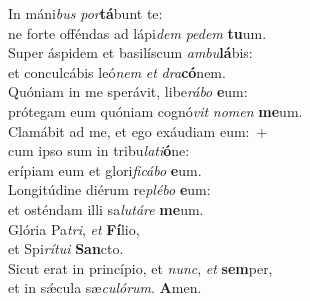 \evenverse In máni\textit{bus} \textit{por}\textbf{tá}bunt te:~\*\\
\evenverse ne forte offéndas ad lápi\textit{dem} \textit{pe}\textit{dem} \textbf{tu}um.\\
\oddverse Super áspidem et basilíscum \textit{am}\textit{bu}\textbf{lá}bis:~\*\\
\oddverse et conculcábis leó\textit{nem} \textit{et} \textit{dra}\textbf{có}nem.\\
\evenverse Quóniam in me sperávit, libe\textit{rá}\textit{bo} \textbf{e}um:~\*\\
\evenverse prótegam eum quóniam cognó\textit{vit} \textit{no}\textit{men} \textbf{me}um.\\
\oddverse Clamábit ad me, et ego exáudiam eum:~+\\
\oddverse  cum ipso sum in tribu\textit{la}\textit{ti}\textbf{ó}ne:~\*\\
\oddverse erípiam eum et glori\textit{fi}\textit{cá}\textit{bo} \textbf{e}um.\\
\evenverse Longitúdine diérum re\textit{plé}\textit{bo} \textbf{e}um:~\*\\
\evenverse et osténdam illi sa\textit{lu}\textit{tá}\textit{re} \textbf{me}um.\\
\oddverse Glória Pa\textit{tri}, \textit{et} \textbf{Fí}lio,~\*\\
\oddverse et Spi\textit{rí}\textit{tu}\textit{i} \textbf{San}cto.\\
\evenverse Sicut erat in princípio, et \textit{nunc}, \textit{et} \textbf{sem}per,~\*\\
\evenverse et in sǽcula sæ\textit{cu}\textit{ló}\textit{rum}. \textbf{A}men.\\
